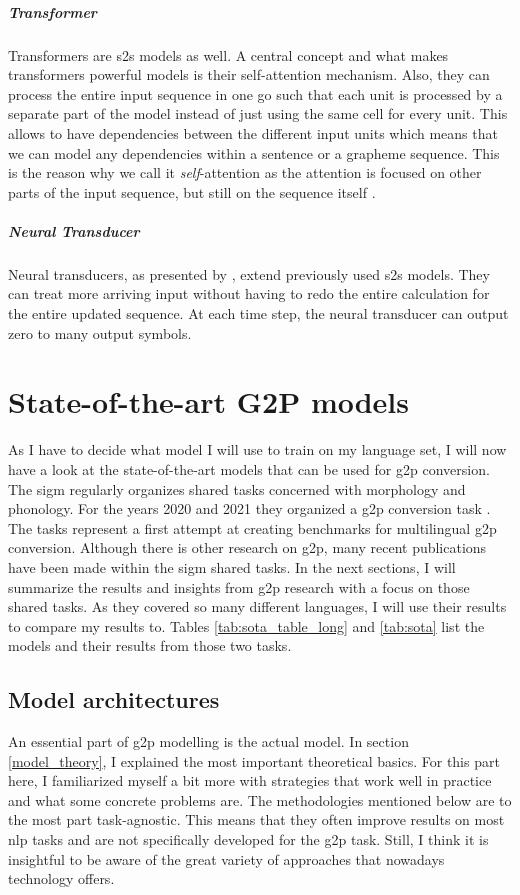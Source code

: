 \subparagraph{Transformer}
Transformers are \ac{s2s} models as well. A central concept and what makes transformers powerful models is their self-attention mechanism. Also, they can process the entire input sequence in one go such that each unit is processed by a separate part of the model instead of just using the same cell for every unit. This allows to have dependencies between the different input units which means that we can model any dependencies within a sentence or a grapheme sequence. This is the reason why we call it \textit{self}-attention as the attention is focused on other parts of the input sequence, but still on the sequence itself \citep{Alammar.03.01.2022}.

\subparagraph{Neural Transducer}
Neural transducers, as presented by \citet{jaitly2016neural}, extend previously used \ac{s2s} models. They can treat more arriving input without having to redo the entire calculation for the entire updated sequence. At each time step, the neural transducer can output zero to many output symbols. 


\section{State-of-the-art G2P models}
\label{section:sig}
As I have to decide what model I will use to train on my language set, I will now have a look at the state-of-the-art models that can be used for \ac{g2p} conversion.  
The \ac{sigm} \citep{Sigmorphon.2021} regularly organizes shared tasks concerned with morphology and phonology. For the years 2020 and 2021 they organized a \ac{g2p} conversion task \citep{Ashby-Bartley.2021, gorman-etal-2020-sigmorphon}. The tasks represent a first attempt at creating benchmarks for multilingual \ac{g2p} conversion. Although there is other research on \ac{g2p}, many recent publications have been made within the \ac{sigm} shared tasks. In the next sections, I will summarize the results and insights from \ac{g2p} research with a focus on those shared tasks. As they covered so many different languages, I will use their results to compare my results to. Tables \ref{tab:sota_table_long} and \ref{tab:sota} list the models and their results from those two tasks.

\subsection{Model architectures}
An essential part of \ac{g2p} modelling is the actual model. In section \ref{model_theory}, I explained the most important theoretical basics. For this part here, I familiarized myself a bit more with strategies that work well in practice and what some concrete problems are. The methodologies mentioned below are to the most part task-agnostic. This means that they often improve results on most \ac{nlp} tasks and are not specifically developed for the \ac{g2p} task. Still, I think it is insightful to be aware of the great variety of approaches that nowadays technology offers. 

